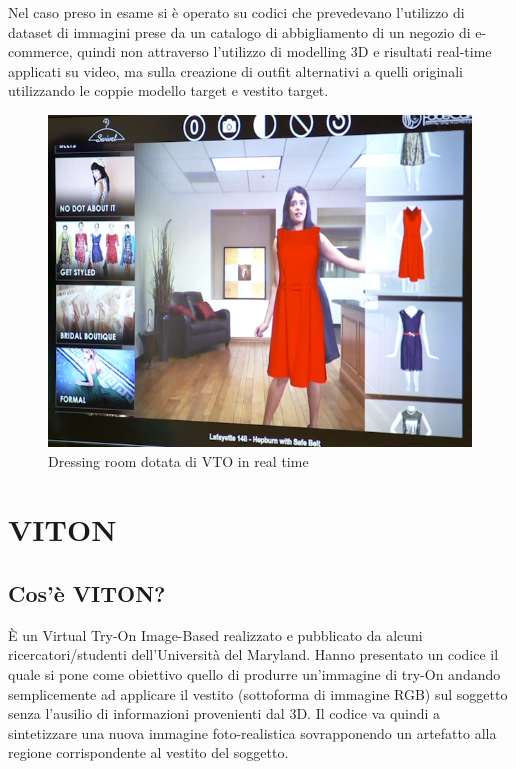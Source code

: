 \documentclass[final, 11pt]{article}
\begin{document}
	Nel caso preso in esame si è operato su codici che prevedevano l'utilizzo di dataset di immagini prese da
un catalogo di abbigliamento di un negozio di e-commerce, quindi non attraverso l'utilizzo di modelling 3D e risultati real-time applicati su video, ma sulla creazione di outfit alternativi a quelli originali utilizzando le coppie modello target e vestito target.
	
	\begin{figure}[!htb]
		\begin{center}
			\includegraphics[scale=.7]{FaceCake-virtual-dressing-room.jpg}
		\end{center} \caption{Dressing room dotata di VTO in real time}
	\end{figure} 

	\section{VITON}
	\subsection{Cos'è VITON?}
	È un Virtual Try-On Image-Based realizzato e pubblicato da alcuni ricercatori/studenti dell’Università del Maryland. Hanno presentato un codice il quale si pone come obiettivo quello di produrre un’immagine di try-On andando semplicemente ad applicare il vestito (sottoforma di immagine RGB) sul soggetto senza l’ausilio di informazioni provenienti dal 3D. Il codice va quindi a sintetizzare una nuova immagine foto-realistica sovrapponendo un artefatto alla regione corrispondente al vestito del soggetto. 
	
\end{document}
